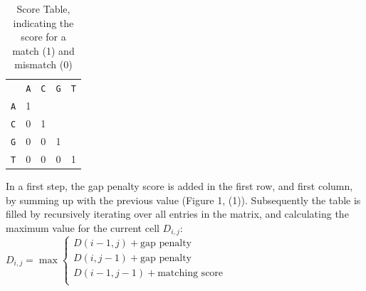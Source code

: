 \begin{table}[H]
\centering
\caption{Score Table, indicating the score for a match (1) and mismatch (0)}
\label{scoreTable}
\begin{tabular}{lllll}
  & \texttt{A} & \texttt{C} & \texttt{G} & \texttt{T} \\
 \texttt{A} & \cellcolor[HTML]{808000}1 &   &   &   \\
\texttt{C} & 0 & \cellcolor[HTML]{808000}1 &   &   \\
\texttt{G} & 0 & 0 & \cellcolor[HTML]{808000}1 &   \\
\texttt{T} & 0 & 0 & 0 & \cellcolor[HTML]{808000}1
\end{tabular}
\end{table}
In a first step, the gap penalty score is added in the first row, and first column, by summing up with the previous value (Figure 1, (1)). Subsequently the table is filled by recursively iterating over all entries in the matrix, and calculating the maximum value for the current cell $D_{i,j}$:
$ D_{i,j} = \max
  \begin{cases}
    D(i-1,j)+ \text{gap penalty}      \\
    D(i,j-1)+ \text{gap penalty} \\
    D(i-1,j-1)+ \text{matching score} \\
  \end{cases}
$


